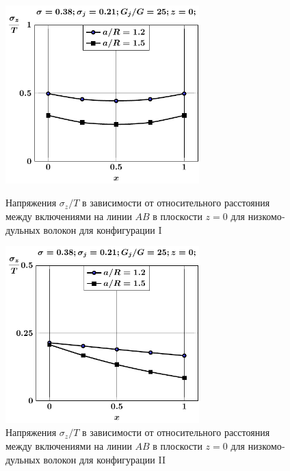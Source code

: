 \begin{russian}
\begin{figure}[h!]
\centering\footnotesize
\parbox[b]{7.5cm}{\centering\includegraphics[width=7.5cm]{inc2a-a-h10-r10-g25-z0-sig_z.pdf}
\caption{Напряжения $\sigma_z/T$ в зависимости от относительного расстояния между включениями на линии $AB$ в плоскости $z=0$ для низкомодульных волокон для конфигурации I
\label{f:7:101}}}\hfil\hfil
\parbox[b]{7.5cm}{\centering\includegraphics[width=7.5cm]{inc2b-a-h10-r10-g25-z0-sig_z.pdf}
\caption{Напряжения $\sigma_z/T$ в зависимости от относительного расстояния между включениями на линии $AB$ в плоскости $z=0$ для низкомодульных волокон для конфигурации II
\label{f:7:102}}}
\end{figure}


\end{russian}
